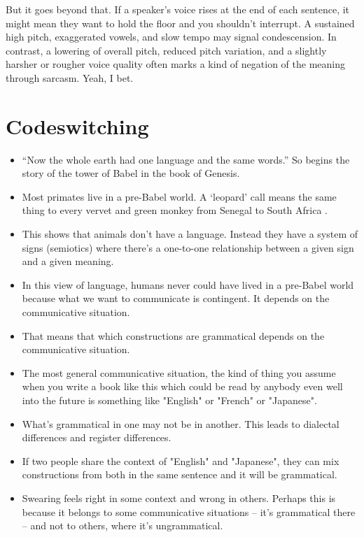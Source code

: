 But it goes beyond that. If a speaker's voice rises at the end of each sentence, it might mean they want to hold the floor and you shouldn't interrupt. A sustained high pitch, exaggerated vowels, and slow tempo may signal condescension. In contrast, a lowering of overall pitch, reduced pitch variation, and a slightly harsher or rougher voice quality often marks a kind of negation of the meaning through sarcasm. Yeah, I bet.


\section{Codeswitching}


\begin{itemize}
    \item ``Now the whole earth had one language and the same words.'' So begins the story of the tower of Babel in the book of Genesis.
    \item Most primates live in a pre-Babel world. A `leopard' call means the same thing to every vervet and green monkey from Senegal to South Africa \citep{Price2014}.
    \item This shows that animals don't have a language. Instead they have a system of signs (semiotics) where there's a one-to-one relationship between a given sign and a given meaning.
    \item In this view of language, humans never could have lived in a pre-Babel world because what we want to communicate is contingent. It depends on the communicative situation.
    \item That means that which constructions are grammatical depends on the communicative situation.
    \item The most general communicative situation, the kind of thing you assume when you write a book like this which could be read by anybody even well into the future is something like "English" or "French" or "Japanese".
    \item What's grammatical in one may not be in another. This leads to dialectal differences and register differences.
    \item If two people share the context of "English" and "Japanese", they can mix constructions from both in the same sentence and it will be grammatical.
    \item Swearing feels right in some context and wrong in others. Perhaps this is because it belongs to some communicative situations -- it's grammatical there -- and not to others, where it's ungrammatical.
\end{itemize}






